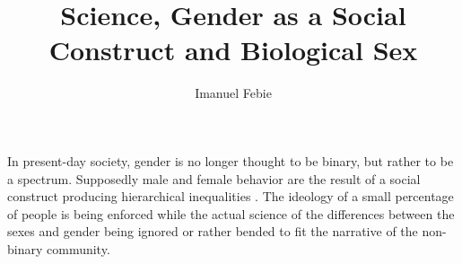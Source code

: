 \documentclass[12pt]{article}
\begin{document}
\title{Science, Gender as a Social Construct and Biological Sex}
\author{Imanuel Febie}
\maketitle


In present-day society, gender is no longer thought to be binary, but rather to be a spectrum. Supposedly male and female behavior are the result of a social construct producing hierarchical inequalities \cite{worldHealthOrganizationGender}. The ideology of a small percentage of people is being enforced while the actual science of the differences between the sexes and gender being ignored or rather bended to fit the narrative of the non-binary community.




 

 
 
\end{document}
